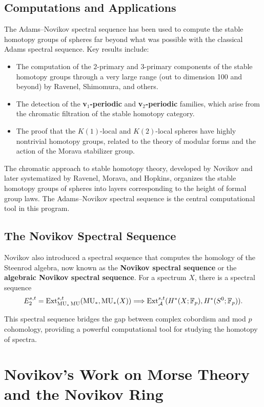 \subsection{Computations and Applications}

The Adams--Novikov spectral sequence has been used to compute the stable homotopy groups of spheres far beyond what was possible with the classical Adams spectral sequence. Key results include:
\begin{itemize}
    \item The computation of the \(2\)-primary and \(3\)-primary components of the stable homotopy groups through a very large range (out to dimension 100 and beyond) by Ravenel, Shimomura, and others.
    \item The detection of the \textbf{v\(_1\)-periodic} and \textbf{v\(_2\)-periodic} families, which arise from the chromatic filtration of the stable homotopy category.
    \item The proof that the \(K(1)\)-local and \(K(2)\)-local spheres have highly nontrivial homotopy groups, related to the theory of modular forms and the action of the Morava stabilizer group.
\end{itemize}

The chromatic approach to stable homotopy theory, developed by Novikov and later systematized by Ravenel, Morava, and Hopkins, organizes the stable homotopy groups of spheres into layers corresponding to the height of formal group laws. The Adams--Novikov spectral sequence is the central computational tool in this program.

\subsection{The Novikov Spectral Sequence}

Novikov also introduced a spectral sequence that computes the homology of the Steenrod algebra, now known as the \textbf{Novikov spectral sequence} or the \textbf{algebraic Novikov spectral sequence}. For a spectrum \(X\), there is a spectral sequence
\[
E_2^{s,t} = \operatorname{Ext}_{\operatorname{MU}_*\operatorname{MU}}^{s,t}(\operatorname{MU}_*, \operatorname{MU}_*(X)) \Longrightarrow \operatorname{Ext}_{\mathcal{A}}^{s,t}(H^*(X; \mathbb{F}_p), H^*(S^0; \mathbb{F}_p)).
\]

This spectral sequence bridges the gap between complex cobordism and mod \(p\) cohomology, providing a powerful computational tool for studying the homotopy of spectra.

\section{Novikov's Work on Morse Theory and the Novikov Ring}

